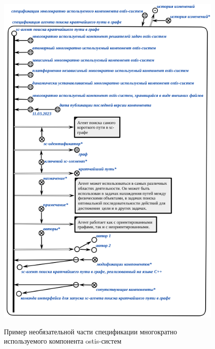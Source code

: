 \begin{figure}[H]
	\caption{Пример необязательной части спецификации многократно используемого компонента ostis-систем}
	\includegraphics[scale=1.0]{author/part5/figures/component_optional_specification_example.png}
	\label{fig:component_optional_specification_example}
\end{figure}

